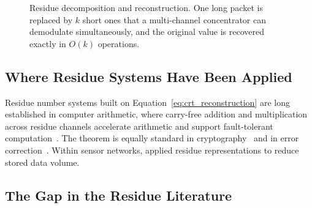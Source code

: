 \documentclass[12pt,a4paper,oneside]{book}
\begin{document}
\begin{figure}[htbp]
  \centering
  \caption{Residue decomposition and reconstruction. One long packet is
           replaced by $k$ short ones that a multi-channel concentrator can
           demodulate simultaneously, and the original value is recovered
           exactly in $O(k)$ operations.}
  \label{fig:crt-concept}
\end{figure}

\subsection{Where Residue Systems Have Been Applied}

Residue number systems built on Equation~\ref{eq:crt_reconstruction} are long
established in computer arithmetic, where carry-free addition and
multiplication across residue channels accelerate arithmetic and support
fault-tolerant computation~\cite{parhami2010computer, shoup2009computational}.
The theorem is equally standard in cryptography~\cite{ding1996remainder,
garner1959residue} and in error correction~\cite{goldreich1999china}. Within
sensor networks, \textcite{wang2018novel} applied residue representations to
reduce stored data volume.

\subsection{The Gap in the Residue Literature}
\end{document}
